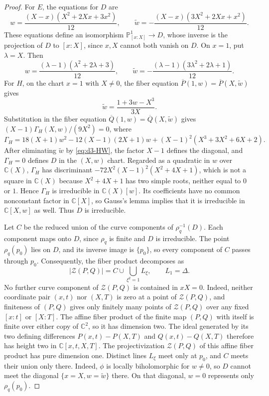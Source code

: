\documentclass[11pt,letterpaper]{article}
\numberwithin{equation}{section}
\theoremstyle{remark}
\theoremstyle{plain}
\newcommand{\C}{\mathbb{C}}
\begin{document}
\begin{proof}
For $E$, the equations for $D$ are
\[
 w=\frac{(X-x)(X^2+2Xx+3x^2)}{12},\qquad
 \widetilde w=-\frac{(X-x)(3X^2+2Xx+x^2)}{12}.
\]
These equations define an isomorphism $\mathbb P^1_{[x:X]}\to D$,
whose inverse is the projection of $D$ to $[x:X]$, since $x,X$
cannot both vanish on $D$.  On $x=1$, put $\lambda=X$.  Then
\begin{equation}
 w=\frac{(\lambda-1)(\lambda^2+2\lambda+3)}{12},\qquad
 \widetilde w=-\frac{(\lambda-1)(3\lambda^2+2\lambda+1)}{12}.
                                                        \label{eq:d3-E-normalization}
\end{equation}
For $H$, on the chart $x=1$ with $X\neq0$, the fiber equation
$\overline P(1,w)=\overline P(X,\widetilde w)$ gives
\begin{equation}
 \widetilde w=\frac{1+3w-X^3}{3X}.                 \label{eq:d3-HW}
\end{equation}
Substitution in the fiber equation
$\overline Q(1,w)=\overline Q(X,\widetilde w)$ gives
$(X-1)\Gamma_H(X,w)/(9X^2)=0$, where
\begin{equation}
 \Gamma_H=18(X+1)w^2-12(X-1)(2X+1)w
 +(X-1)^2(X^3+3X^2+6X+2).                         \label{eq:d3-Gamma}
\end{equation}
After eliminating $\widetilde w$ by \eqref{eq:d3-HW}, the factor $X-1$
defines the diagonal, and $\Gamma_H=0$ defines $D$
in the $(X,w)$ chart.
Regarded as a quadratic in $w$ over $\C(X)$, $\Gamma_H$ has discriminant
$-72X^2(X-1)^2(X^2+4X+1)$, which is not a square in $\C(X)$
because $X^2+4X+1$ has two simple roots, neither equal to $0$ or $1$.
Hence $\Gamma_H$ is irreducible in $\C(X)[w]$.
Its coefficients have no common nonconstant factor in $\C[X]$,
so Gauss's lemma implies that it is irreducible in $\C[X,w]$ as well.
Thus $D$ is irreducible.

Let $C$ be the reduced union of the curve components of
$\rho_q^{-1}(D)$.  Each component maps onto $D$, since $\rho_q$
is finite and $D$ is irreducible.
The point $\rho_q(p_0)$ lies on $D$, and its inverse image is
$\{p_0\}$, so every component of $C$ passes through $p_0$.
Consequently, the fiber product decomposes as
\begin{equation}
 \bigl|\mathcal Z(P,Q)\bigr|
 =C\cup\bigcup_{\xi^q=1}L_\xi,
 \qquad L_1=\Delta.
 \label{eq:d3-fibre-components}
\end{equation}
No further curve component of $\mathcal Z(P,Q)$ is contained in $xX=0$.
Indeed, neither coordinate
pair $(x,t)$ nor $(X,T)$ is zero at a point of $\mathcal Z(P,Q)$,
and finiteness of $(P,Q)$
gives only finitely many points of $\mathcal Z(P,Q)$ over any fixed
$[x:t]$ or $[X:T]$.
The affine fiber product of the finite map $(P,Q)$ with itself is finite
over either copy of $\C^2$, so it has dimension two.
The ideal generated by its two defining differences
$P(x,t)-P(X,T)$ and $Q(x,t)-Q(X,T)$ therefore has height two in
$\C[x,t,X,T]$.
The projectivization $\mathcal Z(P,Q)$ of this affine fiber product
has pure dimension one.
Distinct lines $L_\xi$ meet only at $p_0$, and $C$ meets their
union only there.  Indeed, $\phi$ is locally biholomorphic for
$w\neq0$, so $D$ cannot meet the diagonal
$\{x=X,w=\widetilde w\}$ there.
On that diagonal, $w=0$ represents only $\rho_q(p_0)$.


\end{proof}
\end{document}
